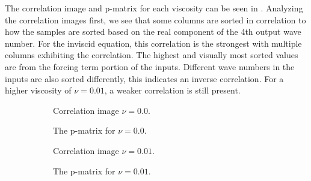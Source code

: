 The correlation image and p-matrix for each viscosity can be seen in . Analyzing the correlation images first, we see that some columns are sorted in correlation to how the samples are sorted based on the real component of the 4th output wave number. For the inviscid equation, this correlation is the strongest with multiple columns exhibiting the correlation. The highest and visually most sorted values are from the forcing term portion of the inputs. Different wave numbers in the inputs are also sorted differently, this indicates an inverse correlation. For a higher viscosity of \(\nu=0.01\), a weaker correlation is still present.

\begin{figure}[H]
  \centering
  \begin{subfigure}{0.49\linewidth}
    \begin{adjustbox}{width=\linewidth}
      
    \end{adjustbox}
    \caption{Correlation image \(\nu=0.0\).}\label{fig:sc2_ci_0.0}
  \end{subfigure}
  \begin{subfigure}{0.49\linewidth}
    \begin{adjustbox}{width=\linewidth}
      
    \end{adjustbox}
    \caption{The p-matrix for \(\nu=0.0\).}\label{fig:sc2_pm_0.0}
  \end{subfigure}
  \begin{subfigure}{0.49\linewidth}
    \begin{adjustbox}{width=\linewidth}
      
    \end{adjustbox}
    \caption{Correlation image \(\nu=0.01\).}\label{fig:sc2_ci_0.01}
  \end{subfigure}
  \begin{subfigure}{0.49\linewidth}
    \begin{adjustbox}{width=\linewidth}
      
    \end{adjustbox}
    \caption{The p-matrix for \(\nu=0.01\).}\label{fig:sc2_pm_0.01}
  \end{subfigure}
  \begin{subfigure}{0.49\linewidth}
    \begin{adjustbox}{width=\linewidth}

\end{adjustbox}
\end{subfigure}
\end{figure}
